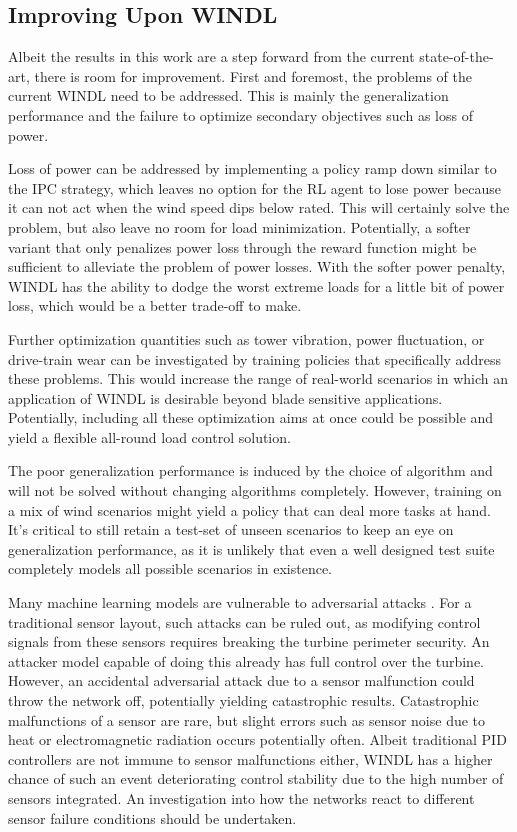 \subsection{Improving Upon WINDL}

Albeit the results in this work are a step forward from the current state-of-the-art, there is room for improvement. First and foremost, the problems of the current WINDL need to be addressed. This is mainly the generalization performance and the failure to optimize secondary objectives such as loss of power. 

Loss of power can be addressed by implementing a policy ramp down similar to the IPC strategy, which leaves no option for the RL agent to lose power because it can not act when the wind speed dips below rated. This will certainly solve the problem, but also leave no room for load minimization. Potentially, a softer variant that only penalizes power loss through the reward function might be sufficient to alleviate the problem of power losses. With the softer power penalty, WINDL has the ability to dodge the worst extreme loads for a little bit of power loss, which would be a better trade-off to make.

Further optimization quantities such as tower vibration, power fluctuation, or drive-train wear can be investigated by training policies that specifically address these problems. This would increase the range of real-world scenarios in which an application of WINDL is desirable beyond blade sensitive applications. Potentially, including all these optimization aims at once could be possible and yield a flexible all-round load control solution.

The poor generalization performance is induced by the choice of algorithm and will not be solved without changing algorithms completely. However, training on a mix of wind scenarios might yield a policy that can deal more tasks at hand. It's critical to still retain a test-set of unseen scenarios to keep an eye on generalization performance, as it is unlikely that even a well designed test suite completely models all possible scenarios in existence. 

Many machine learning models are vulnerable to adversarial attacks \cite{huangAdversarialAttacksNeural2017}. For a traditional sensor layout, such attacks can be ruled out, as modifying control signals from these sensors requires breaking the turbine perimeter security. An attacker model capable of doing this already has full control over the turbine. However, an accidental adversarial attack due to a sensor malfunction could throw the network off, potentially yielding catastrophic results. Catastrophic malfunctions of a sensor are rare, but slight errors such as sensor noise due to heat or electromagnetic radiation occurs potentially often. Albeit traditional PID controllers are not immune to sensor malfunctions either, WINDL has a higher chance of such an event deteriorating control stability due to the high number of sensors integrated. An investigation into how the networks react to different sensor failure conditions should be undertaken.

